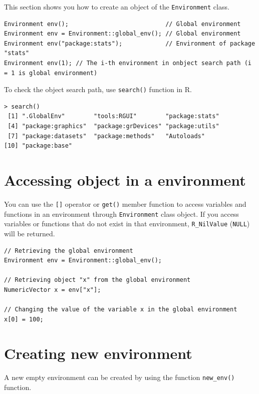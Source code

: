 \documentclass[]{book}
\begin{document}
This section shows you how to create an object of the \texttt{Environment} class.

\begin{verbatim}
Environment env();                           // Global environment
Environment env = Environment::global_env(); // Global environment
Environment env("package:stats");            // Environment of package "stats"
Environment env(1); // The i-th environment in onbject search path (i = 1 is global environment)
\end{verbatim}

To check the object search path, use \texttt{search()} function in R.

\begin{verbatim}
> search()
 [1] ".GlobalEnv"        "tools:RGUI"        "package:stats"    
 [4] "package:graphics"  "package:grDevices" "package:utils"    
 [7] "package:datasets"  "package:methods"   "Autoloads"        
[10] "package:base"   
\end{verbatim}

\hypertarget{accessing-object-in-a-environment}{%
\section{Accessing object in a environment}\label{accessing-object-in-a-environment}}

You can use the \texttt{{[}{]}} operator or \texttt{get()} member function to access variables and functions in an environment through \texttt{Environment} class object. If you access variables or functions that do not exist in that environment, \texttt{R\_NilValue} (\texttt{NULL}) will be returned.

\begin{verbatim}
// Retrieving the global environment
Environment env = Environment::global_env();

// Retrieving object "x" from the global environment
NumericVector x = env["x"];

// Changing the value of the variable x in the global environment
x[0] = 100;
\end{verbatim}

\hypertarget{creating-new-environment}{%
\section{Creating new environment}\label{creating-new-environment}}

A new empty environment can be created by using the function \texttt{new\_env()} function.
\end{document}
